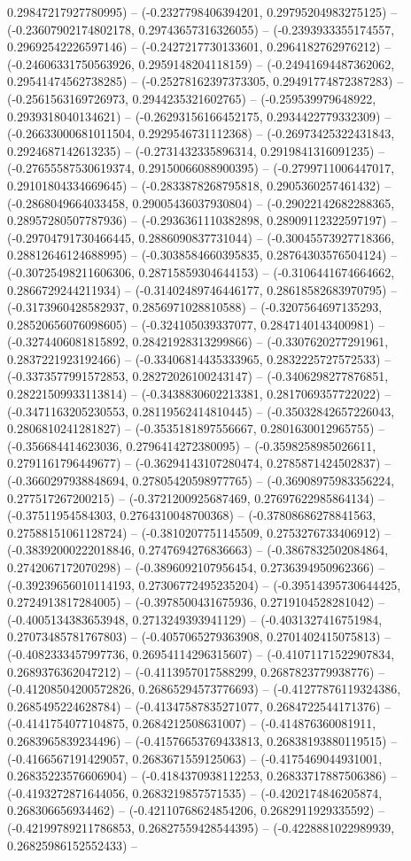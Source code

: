 0.29847217927780995) -- (-0.2327798406394201, 0.29795204983275125) -- (-0.23607902174802178, 0.29743657316326055) -- (-0.2393933355174557, 0.29692542226597146) -- (-0.2427217730133601, 0.2964182762976212) -- (-0.24606331750563926, 0.2959148204118159) -- (-0.24941694487362062, 0.29541474562738285) -- (-0.25278162397373305, 0.29491774872387283) -- (-0.2561563169726973, 0.2944235321602765) -- (-0.259539979648922, 0.2939318040134621) -- (-0.26293156166452175, 0.2934422779332309) -- (-0.26633000681011504, 0.2929546731112368) -- (-0.26973425322431843, 0.2924687142613235) -- (-0.2731432335896314, 0.2919841316091235) -- (-0.27655587530619374, 0.29150066088900395) -- (-0.2799711006447017, 0.29101804334669645) -- (-0.2833878268795818, 0.2905360257461432) -- (-0.2868049664033458, 0.29005436037930804) -- (-0.29022142682288365, 0.28957280507787936) -- (-0.2936361110382898, 0.28909112322597197) -- (-0.29704791730466445, 0.2886090837731044) -- (-0.30045573927718366, 0.28812646124688995) -- (-0.3038584660395835, 0.28764303576504124) -- (-0.30725498211606306, 0.28715859304644153) -- (-0.3106441674664662, 0.2866729244211934) -- (-0.31402489746446177, 0.28618582683970795) -- (-0.3173960428582937, 0.2856971028810588) -- (-0.3207564697135293, 0.28520656076098605) -- (-0.324105039337077, 0.2847140143400981) -- (-0.3274406081815892, 0.28421928313299866) -- (-0.3307620277291961, 0.2837221923192466) -- (-0.33406814435333965, 0.2832225727572533) -- (-0.3373577991572853, 0.28272026100243147) -- (-0.3406298277876851, 0.28221509933113814) -- (-0.3438830602213381, 0.2817069357722022) -- (-0.3471163205230553, 0.28119562414810445) -- (-0.35032842657226043, 0.2806810241281827) -- (-0.3535181897556667, 0.2801630012965755) -- (-0.356684414623036, 0.2796414272380095) -- (-0.3598258985026611, 0.2791161796449677) -- (-0.36294143107280474, 0.2785871424502837) -- (-0.3660297938848694, 0.27805420598977765) -- (-0.36908975983356224, 0.277517267200215) -- (-0.3721200925687469, 0.27697622985864134) -- (-0.37511954584303, 0.2764310048700368) -- (-0.37808686278841563, 0.27588151061128724) -- (-0.3810207751145509, 0.2753276733406912) -- (-0.38392000222018846, 0.2747694276836663) -- (-0.3867832502084864, 0.2742067172070298) -- (-0.3896092107956454, 0.2736394950962366) -- (-0.39239656010114193, 0.27306772495235204) -- (-0.39514395730644425, 0.2724913817284005) -- (-0.3978500431675936, 0.2719104528281042) -- (-0.4005134383653948, 0.2713249393941129) -- (-0.4031327416751984, 0.27073485781767803) -- (-0.4057065279363908, 0.2701402415075813) -- (-0.4082333457997736, 0.26954114296315607) -- (-0.41071171522907834, 0.2689376362047212) -- (-0.4113957017588299, 0.2687823779938776) -- (-0.41208504200572826, 0.26865294573776693) -- (-0.41277876119324386, 0.2685495224628784) -- (-0.41347587835271077, 0.2684722544171376) -- (-0.4141754077104875, 0.2684212508631007) -- (-0.414876360081911, 0.2683965839234496) -- (-0.41576653769433813, 0.26838193880119515) -- (-0.4166567191429057, 0.2683671559125063) -- (-0.4175469044931001, 0.26835223576606904) -- (-0.4184370938112253, 0.26833717887506386) -- (-0.4193272871644056, 0.2683219857571535) -- (-0.4202174846205874, 0.268306656934462) -- (-0.42110768624854206, 0.2682911929335592) -- (-0.42199789211786853, 0.26827559428544395) -- (-0.4228881022989939, 0.26825986152552433) -- 